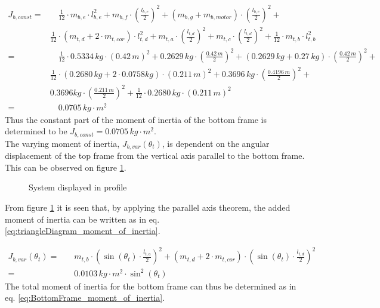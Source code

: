 \documentclass[../../main]{subfiles}
\begin{document}
\begin{equation}
  \label{eq:J_b,const}
  \begin{split}
      J_{b,const} =& \quad \frac{1}{12}\cdot m_{b,e}\cdot l_{b,e}^2 + m_{b,f} \cdot \left( \frac{l_{b,e}}{2} \right)^2 + (m_{b,g}+m_{b,motor}) \cdot \left(\frac{l_{b,e}}{2}\right)^2 +\\
      & \frac{1}{12}\cdot (m_{t,d}+2\cdot m_{t,cor})\cdot l_{t,d}^2 + m_{t,a}\cdot \left(\frac{l_{t,d}}{2}\right)^2 + m_{t,c}\cdot \left(\frac{l_{t,d}}{2}\right)^2 + \frac{1}{12}\cdot m_{t,b} \cdot l_{t,b}^2\\
      =& \quad \frac{1}{12} \cdot 0.5334\si{\,kg} \cdot (0.42\si{\,m})^2 + 0.2629\si{\,kg} \cdot \left( \frac{0.42\si{\,m}}{2} \right)^2 + (0.2629\si{\,kg}+0.27\si{\,kg}) \cdot \left( \frac{0.42\si{\,m}}{2} \right)^2 +\\
      & \frac{1}{12}\cdot (0.2680\si{\,kg}+2\cdot 0.0758\si{kg})\cdot (0.211\si{\,m})^2 + 0.3696\si{\,kg}\cdot \left(\frac{0.4196\si{\,m}}{2}\right)^2 +\\
      &0.3696\si{kg}\cdot \left(\frac{0.211\si{\,m}}{2}\right)^2 + \frac{1}{12}\cdot 0.2680\si{\,kg} \cdot (0.211\si{\,m})^2\\
      =& \quad 0.0705\si{\,kg\cdot m^2}
  \end{split}
\end{equation}
Thus the constant part of the moment of inertia of the bottom frame is determined to be $J_{b,const} = 0.0705\si{\,kg\cdot m^2}$.\\
The varying moment of inertia, $J_{b,var}(\theta_t)$, is dependent on the angular displacement of the top frame from the vertical axis parallel to the bottom frame. This can be observed on figure \ref{fig:TrekantDiagram}.

\begin{figure}[H]
  \centering
  \def\svgwidth{0.4\columnwidth}
  
  \caption{System displayed in profile}
  \label{fig:TrekantDiagram}
\end{figure}

From figure \ref{fig:TrekantDiagram} it is seen that, by applying the parallel axis theorem, the added moment of inertia can be written as in eq. \eqref{eq:triangleDiagram_moment_of_inertia}.

\begin{equation}
  \label{eq:triangleDiagram_moment_of_inertia}
  \begin{split}
  J_{b,var}(\theta_t) =& \quad m_{t,b} \cdot \left( \sin(\theta_t) \cdot \frac{l_{t,a}}{2} \right)^2 + (m_{t,d} + 2\cdot m_{t,cor}) \cdot \left( \sin(\theta_t) \cdot \frac{l_{t,d}}{2}\right)^2\\
  =& \quad 0.0103 \si{\,kg\cdot m^2}\cdot \sin^2(\theta_t)
  \end{split}
\end{equation}
The total moment of inertia for the bottom frame can thus be determined as in eq. \eqref{eq:BottomFrame_moment_of_inertia}.
\end{document}
